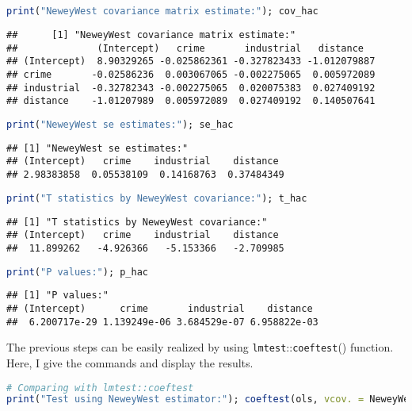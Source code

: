 \documentclass{article}
\theoremstyle{definition}
\begin{document}
\begin{lstlisting}[language=R]
print("NeweyWest covariance matrix estimate:"); cov_hac
\end{lstlisting}

\begin{Verbatim}
## 		[1] "NeweyWest covariance matrix estimate:"
##              (Intercept)   crime       industrial   distance
## (Intercept)  8.90329265 -0.025862361 -0.327823433 -1.012079887
## crime       -0.02586236  0.003067065 -0.002275065  0.005972089
## industrial  -0.32782343 -0.002275065  0.020075383  0.027409192
## distance    -1.01207989  0.005972089  0.027409192  0.140507641
\end{Verbatim}

\begin{lstlisting}[language=R]
print("NeweyWest se estimates:"); se_hac
\end{lstlisting}

\begin{verbatim}
## [1] "NeweyWest se estimates:"
## (Intercept)   crime    industrial    distance 
## 2.98383858  0.05538109  0.14168763  0.37484349 
\end{verbatim}

\begin{lstlisting}[language=R]
print("T statistics by NeweyWest covariance:"); t_hac
\end{lstlisting}

\begin{verbatim}
## [1] "T statistics by NeweyWest covariance:"
## (Intercept)   crime    industrial    distance 
##  11.899262   -4.926366   -5.153366   -2.709985 
\end{verbatim}

\begin{lstlisting}[language=R]
print("P values:"); p_hac
\end{lstlisting}

\begin{verbatim}
## [1] "P values:"
## (Intercept)   	crime    	industrial    distance 
##  6.200717e-29 1.139249e-06 3.684529e-07 6.958822e-03 
\end{verbatim}

The previous steps can be easily realized by using \texttt{lmtest}::\texttt{coeftest}() function. Here, I give the commands and display the results.\\

\begin{lstlisting}[language=R]
# Comparing with lmtest::coeftest 
print("Test using NeweyWest estimator:"); coeftest(ols, vcov. = NeweyWest)
\end{lstlisting}
\end{document}
